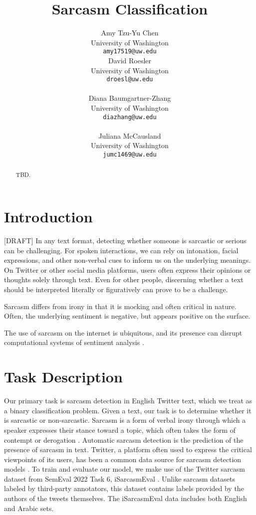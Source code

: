 \documentclass[11pt]{article}
\title{Sarcasm Classification}
\author{Amy Tzu-Yu Chen \\
  University of Washington \\
  \texttt{amy17519@uw.edu} \\\And
  {David Roesler \\
  University of Washington \\
  \texttt{droesl@uw.edu} \\} \\\AND
  {Diana Baumgartner-Zhang \\
  University of Washington \\
  \texttt{diazhang@uw.edu} \\} \\\And
  Juliana McCausland \\
  University of Washington \\
  \texttt{jumc1469@uw.edu} \\}
\begin{document}
\maketitle

\begin{abstract}

TBD.

\end{abstract}

\section{Introduction}

[DRAFT]
In any text format, detecting whether someone is sarcastic or serious can be challenging. For spoken interactions, we can rely on intonation, facial expressions, and other non-verbal cues to inform us on the underlying meanings. On Twitter or other social media platforms, users often express their opinions or thoughts solely through text. Even for other people, discerning whether a text should be interpreted literally or figuratively can prove to be a challenge.

Sarcasm differs from irony in that it is mocking and often critical in nature. Often, the underlying sentiment is negative, but appears positive on the surface.

The use of sarcasm on the internet is ubiquitous, and its presence can disrupt computational systems of sentiment analysis \citealp{Liu2010SentimentAA}.

\section{Task Description}

Our primary task is sarcasm detection in English Twitter text, which we treat as a binary classification problem. Given a text, our task is to determine whether it is sarcastic or non-sarcastic. Sarcasm is a form of verbal irony through which a speaker expresses their stance toward a topic, which often takes the form of contempt or derogation \citealp{WILSON20061722}. Automatic sarcasm detection \citealp{joshi:automatic} is the prediction of the presence of sarcasm in text. 
Twitter, a platform often used to express the critical viewpoints of its users, has been a common data source for sarcasm detection models \citealp{doi:10.1177/1470785320921779}. To train and evaluate our model, we make use of the Twitter sarcasm dataset from SemEval 2022 Task 6, iSarcasmEval \citealp{oprea-magdy-2020-isarcasm}. Unlike sarcasm datasets labeled by third-party annotators, this dataset contains labels provided by the authors of the tweets themselves. The iSarcasmEval data includes both English and Arabic sets. 
\end{document}
